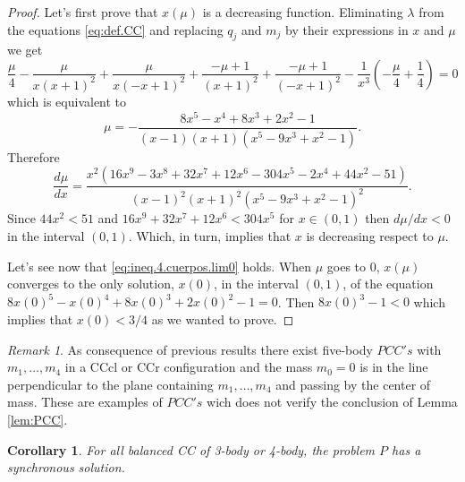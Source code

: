 \documentclass[twoside]{article}
\newtheorem{cor}[thm]{Corollary}
\theoremstyle{remark}
\newtheorem{comentario}{Remark}
\newcounter{example}
\begin{document}
\begin{proof}
Let's first prove that $x(\mu)$ is a decreasing function. Eliminating $\lambda$ from the equations \eqref{eq:def.CC} and replacing $q_j$ and $m_j$ by their expressions in $x$ and $\mu$ we get
\[\frac{\mu}{4} - \frac{\mu}{x \left(x + 1\right)^{2}} + \frac{\mu}{x \left(- x + 1\right)^{2}} + \frac{- \mu + 1}{\left(x + 1\right)^{2}} + \frac{- \mu + 1}{\left(- x + 1\right)^{2}} - \frac{1}{x^{3}} \left(- \frac{\mu}{4} + \frac{1}{4}\right) = 0\]
which is equivalent to
 \[\mu=- \frac{8 x^{5} - x^{4} + 8 x^{3} + 2 x^{2} - 1}{\left(x - 1\right) \left(x + 1\right) \left(x^{5} - 9 x^{3} + x^{2} - 1\right)}.\]
Therefore
\[
 \frac{d\mu}{dx}=\frac{x^{2} \left(16 x^{9} - 3 x^{8} + 32 x^{7} + 12 x^{6} - 304 x^{5} - 2 x^{4} + 44 x^{2} - 51\right)}{\left(x - 1\right)^{2} \left(x + 1\right)^{2} \left(x^{5} - 9 x^{3} + x^{2} - 1\right)^{2}}.
\]
Since $44x^2<51$ and $16 x^{9}  + 32 x^{7} + 12 x^{6} < 304 x^{5}$ for $x\in (0,1)$ then $d\mu/dx<0$ in the interval $ (0,1)$. Which, in turn, implies that $x$ is decreasing respect to $\mu$.





Let's see now that \eqref{eq:ineq.4.cuerpos.lim0} holds. When $\mu$ goes to $0$, $x(\mu)$ converges to the only solution, $x(0)$, in the interval $(0,1)$, of the equation $8 x(0)^{5} - x(0)^{4} + 8 x(0)^{3} + 2 x(0)^{2} - 1=0$.  Then  $ 8 x(0)^{3} -1< 0$ which implies that $x(0)<3/4$ as we wanted to prove.
\end{proof}


\begin{comentario}
As consequence of previous results there exist five-body $PCC's$ with $m_1,\ldots,m_4$  in a CCcl or CCr configuration and the mass $m_0=0$ is in the  line perpendicular to the  plane containing $m_1,\ldots,m_4$ and passing by the center of mass. These are examples of $PCC's$ wich does not verify the conclusion of Lemma \ref{lem:PCC}.
\end{comentario}


\begin{cor}
For all  balanced CC of 3-body or 4-body, the  problem $P$ has a synchronous solution.
\end{cor}
\end{document}
